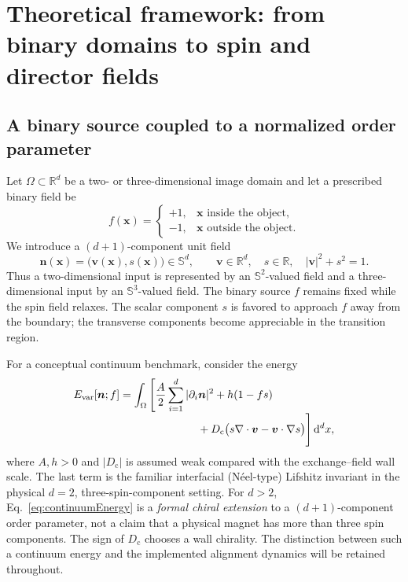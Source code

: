 \documentclass[11pt,a4paper]{article}
\newcommand{\nn}{\bm n}
\newcommand{\vv}{\bm v}
\newcommand{\xx}{\bm x}
\newcommand{\dd}{\mathrm{d}}
\newcommand{\Sn}{\mathbb S}
\newcommand{\diff}{\partial}
\begin{document}
\section{Theoretical framework: from binary domains to spin and director fields}\label{sec:theory}
\subsection{A binary source coupled to a normalized order parameter}\label{subsec:theory:model}
Let \(\Omega\subset\mathbb R^d\) be a two- or three-dimensional image domain and let a prescribed binary field be
\begin{equation}
 f(\xx)=\begin{cases}+1,&\xx\text{ inside the object},\\-1,&\xx\text{ outside the object} .\end{cases}
 \label{eq:binary}
\end{equation}
We introduce a \((d+1)\)-component unit field
\begin{equation}
\nn(\xx)=\bigl(\vv(\xx),s(\xx)\bigr)\in\Sn^d,\qquad
\vv\in\mathbb R^d,\quad s\in\mathbb R,\quad |\vv|^2+s^2=1.
\label{eq:spin}
\end{equation}
Thus a two-dimensional input is represented by an \(\Sn^2\)-valued field and a three-dimensional input by an \(\Sn^3\)-valued field. The binary source \(f\) remains fixed while the spin field relaxes. The scalar component \(s\) is favored to approach \(f\) away from the boundary; the transverse components become appreciable in the transition region.

For a conceptual continuum benchmark, consider the energy
\begin{align}
E_{\mathrm{var}}[\nn;f]&=\int_{\Omega}\Bigg[\frac{A}{2}\sum_{i=1}^{d}|\diff_i\nn|^2
+h(1-fs) \notag\\[-0.3em]
&\hspace{2.5cm}+D_{\mathrm c}\bigl(s\nabla\cdot\vv-\vv\cdot\nabla s\bigr)\Bigg]\,\dd^d x,
\label{eq:continuumEnergy}
\end{align}
where \(A,h>0\) and \(|D_{\mathrm c}|\) is assumed weak compared with the exchange--field wall scale. The last term is the familiar interfacial (N\'eel-type) Lifshitz invariant in the physical \(d=2\), three-spin-component setting. For \(d>2\), Eq.~\eqref{eq:continuumEnergy} is a \emph{formal chiral extension} to a \((d+1)\)-component order parameter, not a claim that a physical magnet has more than three spin components. The sign of \(D_{\mathrm c}\) chooses a wall chirality. The distinction between such a continuum energy and the implemented alignment dynamics will be retained throughout.
\end{document}
